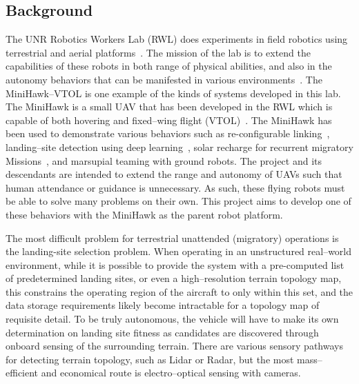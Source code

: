 \documentclass[runningheads]{llncs}
\begin{document}
\subsection{Background}
The UNR Robotics Workers Lab (RWL) does experiments in field robotics using terrestrial and aerial platforms~\cite{AP_ISVC_2020,AP_IROS_2021}. The mission of the lab is to extend the capabilities of these robots in both range of physical abilities, and also in the autonomy behaviors that can be manifested in various environments~\cite{arora2021mobile,AP_AEROCONF_2021}. The MiniHawk--VTOL is one example of the kinds of systems developed in this lab. The MiniHawk is a small UAV that has been developed in the RWL which is capable of both hovering and fixed--wing flight (VTOL)~\cite{carlson2021minihawk}. The MiniHawk has been used to demonstrate various behaviors such as re-configurable linking~\cite{carlson2022multi}, landing--site detection using deep learning~\cite{arora2022deep}, solar recharge for recurrent migratory Missions~\cite{carlson2022integrated,carlson2022solar,carlson2021migratory}, and marsupial teaming with ground robots. The project and its descendants are intended to extend the range and autonomy of UAVs such that human attendance or guidance is unnecessary. As such, these flying robots must be able to solve many problems on their own. This project aims to develop one of these behaviors with the MiniHawk as the parent robot platform.


The most difficult problem for terrestrial unattended (migratory) operations is the landing-site selection problem. When operating in an unstructured real--world environment, while it is possible to provide the system with a pre-computed list of predetermined landing sites, or even a high--resolution terrain topology map, this constrains the operating region of the aircraft to only within this set, and the data storage requirements likely become intractable for a topology map of requisite detail. To be truly autonomous, the vehicle will have to make its own determination on landing site fitness as candidates are discovered through onboard sensing of the surrounding terrain. There are various sensory pathways for detecting terrain topology, such as Lidar or Radar, but the most mass--efficient and economical route is electro--optical sensing with cameras.
\end{document}
